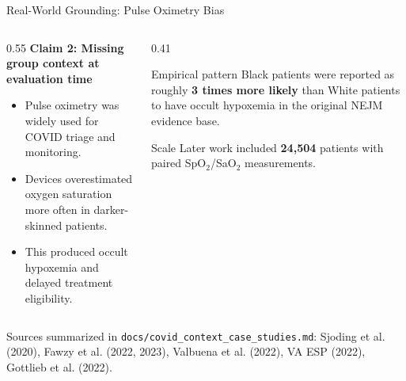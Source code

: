 \documentclass[aspectratio=169,10pt]{beamer}
\begin{document}
\begin{frame}{Real-World Grounding: Pulse Oximetry Bias}
\begin{columns}[T]
\begin{column}{0.55\textwidth}
\textbf{Claim 2: Missing group context at evaluation time}
\begin{itemize}
    \item Pulse oximetry was widely used for COVID triage and monitoring.
    \item Devices overestimated oxygen saturation more often in darker-skinned patients.
    \item This produced occult hypoxemia and delayed treatment eligibility.
\end{itemize}
\end{column}
\begin{column}{0.41\textwidth}
\begin{block}{Empirical pattern}
Black patients were reported as roughly \textbf{3 times more likely} than White patients to have occult hypoxemia in the original NEJM evidence base.
\end{block}
\begin{block}{Scale}
Later work included \textbf{24,504} patients with paired SpO$_2$/SaO$_2$ measurements.
\end{block}
\end{column}
\end{columns}

\vspace{0.4em}
\footnotesize Sources summarized in \texttt{docs/covid\_context\_case\_studies.md}: Sjoding et al. (2020), Fawzy et al. (2022, 2023), Valbuena et al. (2022), VA ESP (2022), Gottlieb et al. (2022).
\end{frame}
\end{document}

